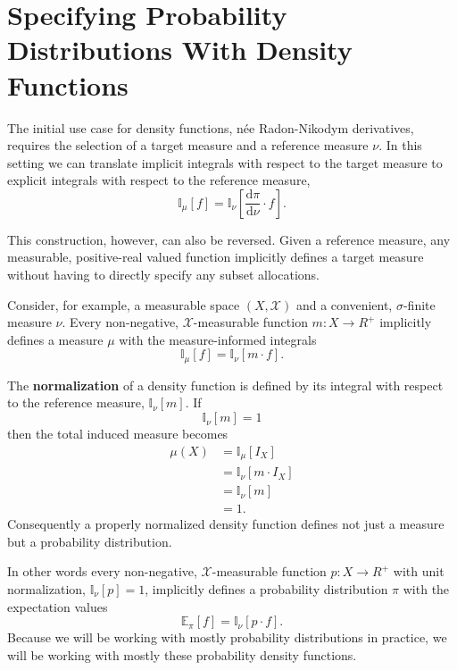 \documentclass[
  letterpaper,
  DIV=11,
  numbers=noendperiod]{scrartcl}
\begin{document}
\hypertarget{specifying-probability-distributions-with-density-functions}{%
\section{Specifying Probability Distributions With Density
Functions}\label{specifying-probability-distributions-with-density-functions}}

The initial use case for density functions, née Radon-Nikodym
derivatives, requires the selection of a target measure and a reference
measure \(\nu\). In this setting we can translate implicit integrals
with respect to the target measure to explicit integrals with respect to
the reference measure, \[
\mathbb{I}_{\mu}[f] =
\mathbb{I}_{\nu}
\left[ \frac{ \mathrm{d} \pi}{ \mathrm{d} \nu } \cdot f \right].
\]

This construction, however, can also be reversed. Given a reference
measure, any measurable, positive-real valued function implicitly
defines a target measure without having to directly specify any subset
allocations.

Consider, for example, a measurable space \((X, \mathcal{X})\) and a
convenient, \(\sigma\)-finite measure \(\nu\). Every non-negative,
\(\mathcal{X}\)-measurable function \(m : X \rightarrow R^{+}\)
implicitly defines a measure \(\mu\) with the measure-informed integrals
\[
\mathbb{I}_{\mu}[f] = \mathbb{I}_{\nu} \left[ m \cdot f \right].
\]

The \textbf{normalization} of a density function is defined by its
integral with respect to the reference measure,
\(\mathbb{I}_{\nu}[ m ]\). If \[
\mathbb{I}_{\nu}[ m ] = 1
\] then the total induced measure becomes \begin{align*}
\mu(X)
&=
\mathbb{I}_{\mu}[I_{X}]
\\
&=
\mathbb{I}_{\nu} [ m \cdot I_{X} ]
\\
&=
\mathbb{I}_{\nu} [ m ]
\\
&=
1.
\end{align*} Consequently a properly normalized density function defines
not just a measure but a probability distribution.

In other words every non-negative, \(\mathcal{X}\)-measurable function
\(p : X \rightarrow R^{+}\) with unit normalization,
\(\mathbb{I}_{\nu} [ p ] = 1\), implicitly defines a probability
distribution \(\pi\) with the expectation values \[
\mathbb{E}_{\pi}[f] = \mathbb{I}_{\nu} \left[ p \cdot f \right].
\] Because we will be working with mostly probability distributions in
practice, we will be working with mostly these probability density
functions.
\end{document}
